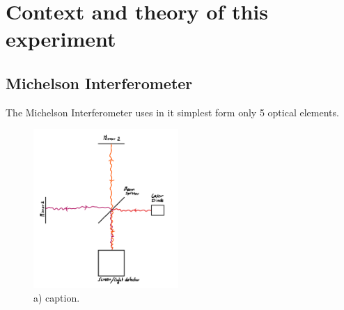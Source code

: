\documentclass[a4paper,10pt]{article}
\begin{document}
\section*{Context and theory of this experiment}

\subsection*{Michelson Interferometer}
The Michelson Interferometer uses in it simplest form only 5 optical elements.

\begin{figure}[h]
    \includegraphics[width=0.49\textwidth]{M_Interferometer.PNG}
    \caption{a) caption.}
    \label{fig:1}
\end{figure}
\end{document}
